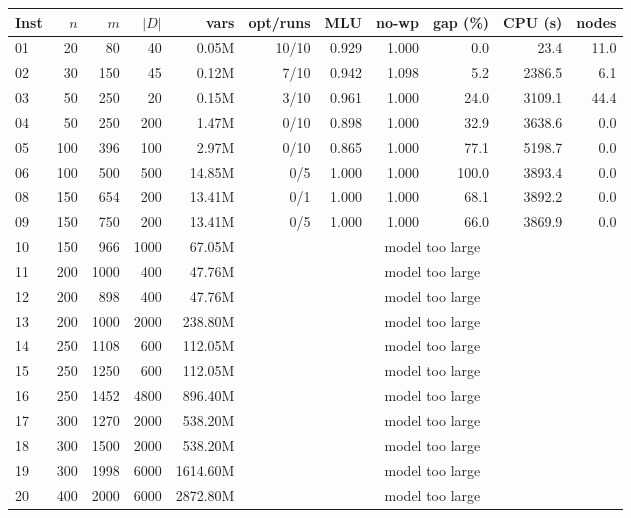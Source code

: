 \begin{tabular}{lrrrrrrrrrr}
\toprule
Inst & $n$ & $m$ & $|D|$ & vars & opt/runs & MLU & no-wp & gap (\%) & CPU (s) & nodes \\
\midrule
01 & 20 & 80 & 40 & 0.05M & 10/10 & 0.929 & 1.000 & 0.0 & 23.4 & 11.0 \\
02 & 30 & 150 & 45 & 0.12M & 7/10 & 0.942 & 1.098 & 5.2 & 2386.5 & 6.1 \\
03 & 50 & 250 & 20 & 0.15M & 3/10 & 0.961 & 1.000 & 24.0 & 3109.1 & 44.4 \\
04 & 50 & 250 & 200 & 1.47M & 0/10 & 0.898 & 1.000 & 32.9 & 3638.6 & 0.0 \\
05 & 100 & 396 & 100 & 2.97M & 0/10 & 0.865 & 1.000 & 77.1 & 5198.7 & 0.0 \\
06 & 100 & 500 & 500 & 14.85M & 0/5 & 1.000 & 1.000 & 100.0 & 3893.4 & 0.0 \\
08 & 150 & 654 & 200 & 13.41M & 0/1 & 1.000 & 1.000 & 68.1 & 3892.2 & 0.0 \\
09 & 150 & 750 & 200 & 13.41M & 0/5 & 1.000 & 1.000 & 66.0 & 3869.9 & 0.0 \\
10 & 150 & 966 & 1000 & 67.05M & \multicolumn{6}{c}{model too large} \\
11 & 200 & 1000 & 400 & 47.76M & \multicolumn{6}{c}{model too large} \\
12 & 200 & 898 & 400 & 47.76M & \multicolumn{6}{c}{model too large} \\
13 & 200 & 1000 & 2000 & 238.80M & \multicolumn{6}{c}{model too large} \\
14 & 250 & 1108 & 600 & 112.05M & \multicolumn{6}{c}{model too large} \\
15 & 250 & 1250 & 600 & 112.05M & \multicolumn{6}{c}{model too large} \\
16 & 250 & 1452 & 4800 & 896.40M & \multicolumn{6}{c}{model too large} \\
17 & 300 & 1270 & 2000 & 538.20M & \multicolumn{6}{c}{model too large} \\
18 & 300 & 1500 & 2000 & 538.20M & \multicolumn{6}{c}{model too large} \\
19 & 300 & 1998 & 6000 & 1614.60M & \multicolumn{6}{c}{model too large} \\
20 & 400 & 2000 & 6000 & 2872.80M & \multicolumn{6}{c}{model too large} \\
\bottomrule
\end{tabular}
